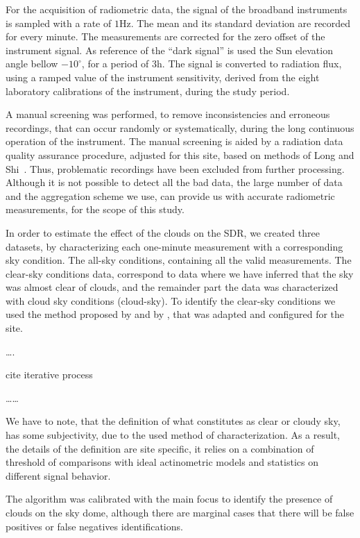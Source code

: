 \documentclass[preprint, 3p,
authoryear]{elsarticle} %
\begin{document}
For the acquisition of radiometric data, the signal of the broadband
instruments is sampled with a rate of \(1 \text{Hz}\). The mean and its
standard deviation are recorded for every minute. The measurements are
corrected for the zero offset of the instrument signal. As reference of
the ``dark signal'' is used the Sun elevation angle bellow
\(-10^\circ\), for a period of \(3 \text{h}\). The signal is converted
to radiation flux, using a ramped value of the instrument sensitivity,
derived from the eight laboratory calibrations of the instrument, during
the study period.

A manual screening was performed, to remove inconsistencies and
erroneous recordings, that can occur randomly or systematically, during
the long continuous operation of the instrument. The manual screening is
aided by a radiation data quality assurance procedure, adjusted for this
site, based on methods of Long and
Shi~\citetext{\citeyear{Long2008a}; \citeyear{Long2006}}. Thus,
problematic recordings have been excluded from further processing.
Although it is not possible to detect all the bad data, the large number
of data and the aggregation scheme we use, can provide us with accurate
radiometric measurements, for the scope of this study.

In order to estimate the effect of the clouds on the SDR, we created
three datasets, by characterizing each one-minute measurement with a
corresponding sky condition. The all-sky conditions, containing all the
valid measurements. The clear-sky conditions data, correspond to data
where we have inferred that the sky was almost clear of clouds, and the
remainder part the data was characterized with cloud sky conditions
(cloud-sky). To identify the clear-sky conditions we used the method
proposed by \citet{Long2000} and by \citet{Reno2016}, that was adapted
and configured for the site.

\ldots.

cite iterative process

\ldots\ldots{}

We have to note, that the definition of what constitutes as clear or
cloudy sky, has some subjectivity, due to the used method of
characterization. As a result, the details of the definition are site
specific, it relies on a combination of threshold of comparisons with
ideal actinometric models and statistics on different signal behavior.

The algorithm was calibrated with the main focus to identify the
presence of clouds on the sky dome, although there are marginal cases
that there will be false positives or false negatives identifications.
\end{document}
